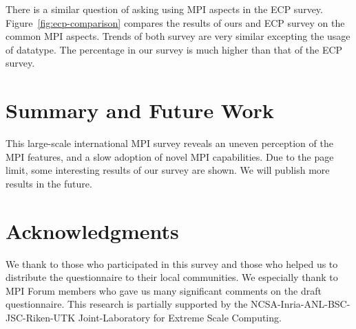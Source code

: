 \documentclass[sigconf,nonacm]{acmart}
\begin{document}
There is a similar question of asking using MPI aspects in the ECP
survey. Figure~\ref{fig:ecp-comparison} compares the results of ours
and ECP survey on the common MPI aspects. Trends of both survey are
very similar excepting the usage of datatype. The percentage in our
survey is much higher than that of the ECP survey. 

\section{Summary and Future Work}

This large-scale international MPI survey reveals an uneven perception of the
MPI features, and a slow adoption of novel MPI capabilities. Due to
the page limit, some interesting results of our survey are shown. We
will publish more results in the future.

%

\section*{Acknowledgments}
We thank to those who participated in this survey and those who
helped us to distribute the questionnaire to their local
communities. We especially thank to MPI Forum members who gave us many
significant comments on the draft questionnaire.
This research is partially supported by the
NCSA-Inria-ANL-BSC-JSC-Riken-UTK Joint-Laboratory for Extreme Scale
Computing\cite{JLESC}.



\end{document}
